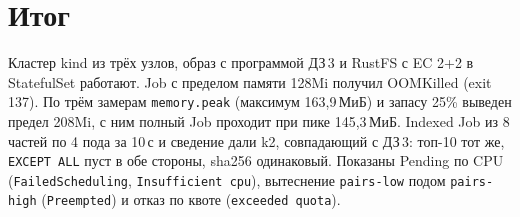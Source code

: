 \documentclass[11pt,a4paper]{article}
\DeclareRobustCommand{\code}[1]{\begingroup\renewcommand{\_}{\textunderscore\allowbreak}\renewcommand{\slash}{/\allowbreak}\texttt{#1}\endgroup}
\begin{document}
\section{Итог}

Кластер kind из трёх узлов, образ с программой ДЗ\,3 и RustFS с EC 2+2 в StatefulSet работают. Job с пределом памяти 128Mi получил OOMKilled (exit 137). По трём замерам \code{memory.peak} (максимум 163,9\,МиБ) и запасу 25\% выведен предел 208Mi, с ним полный Job проходит при пике 145,3\,МиБ. Indexed Job из 8 частей по 4 пода за 10\,с и сведение дали k2, совпадающий с ДЗ\,3: топ-10 тот же, \code{EXCEPT ALL} пуст в обе стороны, sha256 одинаковый. Показаны Pending по CPU (\code{FailedScheduling}, \code{Insufficient cpu}), вытеснение \code{pairs-low} подом \code{pairs-high} (\code{Preempted}) и отказ по квоте (\code{exceeded quota}).
\end{document}
